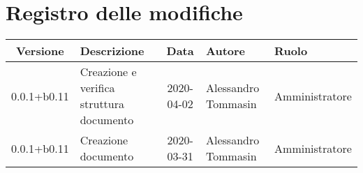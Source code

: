 \section*{Registro delle modifiche}

\begin{center}
	\begin{longtable}{|c|p{3.5cm}|c|p{3cm}|p{3cm}|}
	\hline
	\rowcolor{lighter-grayer}
	\textbf{Versione} & \textbf{Descrizione} & \textbf{Data} & \textbf{Autore} & \textbf{Ruolo} \\
	\hline
	\endfirsthead
	0.0.1+b0.11 & Creazione e verifica struttura documento & 2020-04-02 & Alessandro Tommasin & Amministratore \\
	\hline
	0.0.1+b0.11 & Creazione documento & 2020-03-31 & Alessandro Tommasin & Amministratore \\
	\hline
	\hline
	\end{longtable}
\end{center}